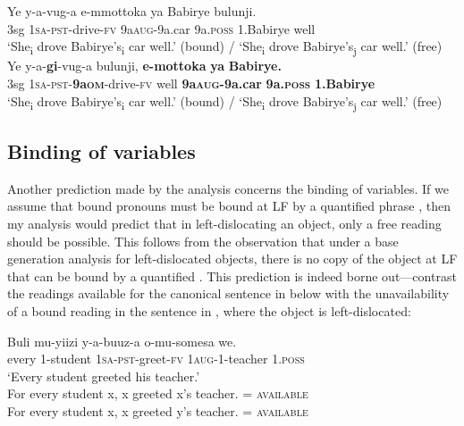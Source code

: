 \documentclass[output=paper
,newtxmath
,modfonts
,nonflat]{langsci/langscibook}
\begin{document}
\ea\label{ex:ranero:34}
\ea\label{ex:ranero:34a}
\gll Ye  y-a-vug-a             e-mmottoka   ya          Babirye   bulunji.\\
3sg \textsc{1sa-pst}{}-drive-\textsc{fv} 9a\textsc{aug}{}-9a.car 9a.\textsc{poss} 1.Babirye well\\
\glt *‘She\textsubscript{i} drove Babirye’s\textsubscript{i} car well.’ (bound) / ‘She\textsubscript{i} drove Babirye’s\textsubscript{j} car well.’ (free)
\ex\label{ex:ranero:34b}
\gll Ye  y-a-\textbf{gi}{}-vug-a          bulunji, \textbf{e-mottoka}       \textbf{ya}          \textbf{Babirye.}\\
3sg \textsc{1sa-pst}{}-\textbf{9a\textsc{om}}{}-drive-\textsc{fv} well       \textbf{9a\textsc{aug}}\textbf{{}-9a.car} \textbf{9a.}\textbf{\textsc{poss}} \textbf{1.Babirye}\\
\glt *‘She\textsubscript{i} drove Babirye’s\textsubscript{i} car well.’ (bound) / ‘She\textsubscript{i} drove Babirye’s\textsubscript{j} car well.’ (free)
\z
\z

\subsection{Binding of variables}\label{sec:ranero:5.2}

\textup{Another prediction made by the analysis concerns the binding of variables. If we assume that bound pronouns must be bound at LF by a quantified phrase \citep[see][]{Hornstein1990}, then my analysis would predict that in left-dislocating an object, only a free reading should be possible. This follows from the observation that under a base generation analysis for left-dislocated objects, there is no copy of the object at LF that can be bound by a quantified . This prediction is indeed borne out—contrast the readings available for the canonical sentence in  below with the unavailability of a bound reading in the sentence in , where the object is left-dislocated:}


\ea\label{ex:ranero:35}
\gll Buli   mu-yiizi   y-a-buuz-a     o-mu-somesa     we.\\
every 1-student  \textsc{1sa-pst}{}-greet-\textsc{fv} \textsc{1aug-}1-teacher 1.\textsc{poss}\\
\glt ‘Every student greeted his teacher.’\\ 
\-\hspace{1cm}For every student x, x greeted x’s teacher. = \textsc{available}\\
\-\hspace{1cm}For every student x, x greeted y’s teacher. = \textsc{available}
\z
\end{document}
